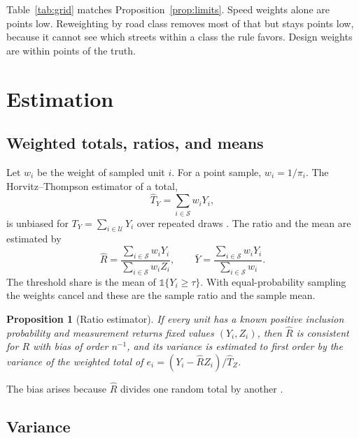 \documentclass[11pt]{article}
\newtheorem{proposition}{Proposition}
\newcommand{\ind}{\mathbb{1}}
\newcommand{\Rhat}{\widehat{R}}
\newcommand{\That}{\widehat{T}}
\newcommand{\Yba}{\bar{Y}}
\newcommand{\sample}{\mathcal{S}}
\newcommand{\universe}{\mathcal{U}}
\begin{document}
Table~\ref{tab:grid} matches Proposition~\ref{prop:limits}. Speed weights alone are \gridbiaspermeter{} points low. Reweighting by road class removes most of that but stays \gridbiasroadnetwork{} points low, because it cannot see which streets within a class the rule favors. Design weights are within \gridbiasdesignweights{} points of the truth.

\section{Estimation}

\subsection{Weighted totals, ratios, and means}

Let $w_i$ be the weight of sampled unit $i$. For a point sample, $w_i = 1/\pi_i$. The Horvitz--Thompson estimator of a total,
\begin{equation}
    \That_Y = \sum_{i \in \sample} w_i Y_i,
\end{equation}
is unbiased for $T_Y = \sum_{i \in \universe} Y_i$ over repeated draws \citep{horvitz1952generalization}. The ratio and the mean are estimated by
\begin{equation}
    \Rhat = \frac{\sum_{i \in \sample} w_i Y_i}{\sum_{i \in \sample} w_i Z_i},
    \qquad
    \Yba = \frac{\sum_{i \in \sample} w_i Y_i}{\sum_{i \in \sample} w_i}.
\end{equation}
The threshold share is the mean of $\ind\{Y_i \geq \tau\}$. With equal-probability sampling the weights cancel and these are the sample ratio and the sample mean.

\begin{proposition}[Ratio estimator]
\label{prop:ratio}
If every unit has a known positive inclusion probability and measurement returns fixed values $(Y_i, Z_i)$, then $\Rhat$ is consistent for $R$ with bias of order $n^{-1}$, and its variance is estimated to first order by the variance of the weighted total of $e_i = (Y_i - \Rhat Z_i)/\That_Z$.
\end{proposition}

The bias arises because $\Rhat$ divides one random total by another \citep{cochran1977sampling}.

\subsection{Variance}
\end{document}
